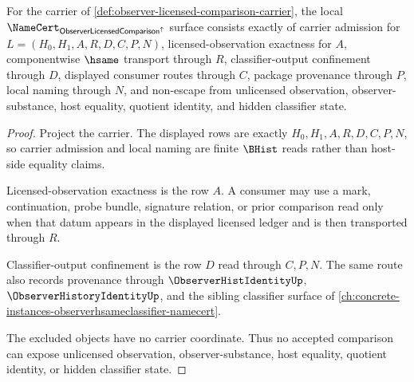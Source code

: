 \begin{theorem}
\label{thm:observer-licensed-comparison-namecert-obligations}
For the carrier of \autoref{def:observer-licensed-comparison-carrier}, the local $\NameCert_{\mathsf{ObserverLicensedComparison}^{\uparrow}}$ surface consists exactly of carrier admission for $L=(H_0,H_1,A,R,D,C,P,N)$, licensed-observation exactness for $A$, componentwise $\hsame$ transport through $R$, classifier-output confinement through $D$, displayed consumer routes through $C$, package provenance through $P$, local naming through $N$, and non-escape from unlicensed observation, observer-substance, host equality, quotient identity, and hidden classifier state.
\end{theorem}
\begin{proof}
Project the carrier. The displayed rows are exactly $H_0,H_1,A,R,D,C,P,N$, so carrier admission and local naming are finite $\BHist$ reads rather than host-side equality claims.

Licensed-observation exactness is the row $A$. A consumer may use a mark, continuation, probe bundle, signature relation, or prior comparison read only when that datum appears in the displayed licensed ledger and is then transported through $R$.

Classifier-output confinement is the row $D$ read through $C,P,N$. The same route also records provenance through $\ObserverHistIdentityUp$, $\ObserverHistoryIdentityUp$, and the sibling classifier surface of \autoref{ch:concrete-instances-observerhsameclassifier-namecert}.

The excluded objects have no carrier coordinate. Thus no accepted comparison can expose unlicensed observation, observer-substance, host equality, quotient identity, or hidden classifier state.
\end{proof}


